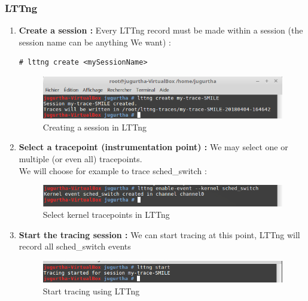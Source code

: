 \subsubsection{LTTng}


\begin{enumerate}
	\item \textbf{Create a session :} Every LTTng record must be made within a session (the session name can be anything We want) :
		\begin{lstlisting}[style=BashInputStyle]
# lttng create <mySessionName>
	\end{lstlisting}	

		\begin{figure}[H]
			\centering
        	\includegraphics[scale=0.32]{img/solution/create-session-lttng.png}
        	\caption{Creating a session in LTTng}
        	\label{Creating a session in LTTng}
    	\end{figure}	
	
	
	\item \textbf{Select a tracepoint (instrumentation point) : } We may select one or multiple (or even all) tracepoints.\\
We will choose for example to trace \og sched\_switch \fg :

		\begin{figure}[H]
			\centering
        	\includegraphics[scale=0.32]{img/solution/lttng-select-event.png}
        	\caption{Select kernel tracepoints in LTTng}
        	\label{Select kernel tracepoints in LTTng}
    	\end{figure}



	\item \textbf{Start the tracing session :} We can start tracing at this point, LTTng will record all \og sched\_switch \fg events
		\begin{figure}[H]
			\centering
        	\includegraphics[scale=0.32]{img/solution/lttng-start-tracing.png}
        	\caption{Start tracing using LTTng}
        	\label{Start tracing using LTTng}
    	\end{figure}



\end{enumerate}
